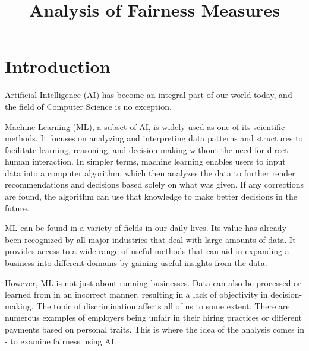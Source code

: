 \documentclass[sn-vancouver]{sn-jnl}%
\theoremstyle{thmstyleone}%
\theoremstyle{thmstyletwo}%
\theoremstyle{thmstylethree}%
\begin{document}
\title[Analysis of Fairness Measures]{Analysis of Fairness Measures}


\author*[]{ }

\author[]{ }

\author[]{ }

\maketitle

\section{Introduction}\label{sec1}

Artificial Intelligence (AI) has become an integral part of our world today, and the field of Computer Science is no exception.

Machine Learning (ML), a subset of AI, is widely used as one of its scientific methods. It focuses on analyzing and interpreting data patterns and structures to facilitate learning, reasoning, and decision-making without the need for direct human interaction. In simpler terms, machine learning enables users to input data into a computer algorithm, which then analyzes the data to further render recommendations and decisions based solely on what was given. If any corrections are found, the algorithm can use that knowledge to make better decisions in the future.

ML can be found in a variety of fields in our daily lives. Its value has already been recognized by all major industries that deal with large amounts of data. It provides access to a wide range of useful methods that can aid in expanding a business into different domains by gaining useful insights from the data. 

However, ML is not just about running businesses. Data can also be processed or learned from in an incorrect manner, resulting in a lack of objectivity in decision-making. The topic of discrimination affects all of us to some extent. There are numerous examples of employers being unfair in their hiring practices or different payments based on personal traits. This is where the idea of the analysis comes in - to examine fairness using AI.
\end{document}
